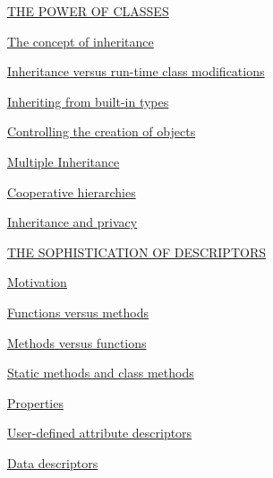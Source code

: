 \documentclass[10pt,english]{article}
\begin{document}
\begin{list}{}{}
\begin{list}{}{}
\end{list}

\item {} \href{\#the-power-of-classes}{THE POWER OF CLASSES}
\begin{list}{}{}
\item {} \href{\#the-concept-of-inheritance}{The concept of inheritance}

\item {} \href{\#inheritance-versus-run-time-class-modifications}{Inheritance versus run-time class modifications}

\item {} \href{\#inheriting-from-built-in-types}{Inheriting from built-in types}

\item {} \href{\#controlling-the-creation-of-objects}{Controlling the creation of objects}

\item {} \href{\#multiple-inheritance}{Multiple Inheritance}

\item {} \href{\#cooperative-hierarchies}{Cooperative hierarchies}

\item {} \href{\#inheritance-and-privacy}{Inheritance and privacy}

\end{list}

\item {} \href{\#the-sophistication-of-descriptors}{THE SOPHISTICATION OF DESCRIPTORS}
\begin{list}{}{}
\item {} \href{\#motivation}{Motivation}

\item {} \href{\#functions-versus-methods}{Functions versus methods}

\item {} \href{\#methods-versus-functions}{Methods versus functions}

\item {} \href{\#static-methods-and-class-methods}{Static methods and class methods}

\item {} \href{\#properties}{Properties}

\item {} \href{\#user-defined-attribute-descriptors}{User-defined attribute descriptors}

\item {} \href{\#data-descriptors}{Data descriptors}


\end{list}
\end{list}
\end{document}
